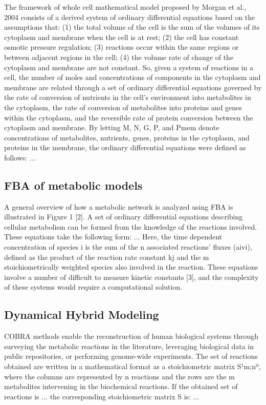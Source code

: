 The framework of whole cell mathematical model proposed by Morgan et al., 2004 consists of a derived system of ordinary differential equations based on the assumptions that: (1) the total volume of the cell is the sum of the volumes of its cytoplasm and membrane when the cell is at rest; (2) the cell has constant osmotic pressure regulation; (3) reactions occur within the same regions or between adjacent regions in the cell; (4) the volume rate of change of the cytoplasm and membrane are not constant. So, given a system of reactions in a cell, the number of moles and concentrations of components in the cytoplasm and membrane are related through a set of ordinary differential equations governed by the rate of conversion of nutrients in the cell’s environment into metabolites in the cytoplasm, the rate of conversion of metabolites into proteins and genes within the cytoplasm, and the reversible rate of protein conversion between the cytoplasm and membrane. By letting M, N, G, P, and Pmem denote concentrations of metabolites, nutrients, genes, proteins in the cytoplasm, and proteins in the membrane, the ordinary differential equations were defined as follows: ...

\subsection{FBA of metabolic models}
A general overview of how a metabolic network is analyzed using FBA is illustrated in
Figure 1 [2]. A set of ordinary differential equations describing cellular metabolism can be
formed from the knowledge of the reactions involved. These equations take the following form: ... Here, the time dependent concentration of species i is the sum of the n associated reactions’
fluxes (aivi), defined as the product of the reaction rate constant kj and the m stoichiometrically
weighted species also involved in the reaction. These equations involve a number of difficult to
measure kinetic constants [3], and the complexity of these systems would require a
computational solution.

\subsection{Dynamical Hybrid Modeling}
COBRA methods enable the reconstruction of human biological systems through surveying
the metabolic reactions in the literature, leveraging biological data in public repositories,
or performing genome-wide experiments. The set of reactions obtained are written in a
mathematical format as a stoichiometric matrix S¹m;nº, where the columns are represented by
n reactions and the rows are the m metabolites intervening in the biochemical reactions. If
the obtained set of reactions is ... the corresponding stoichiometric matrix S is: ...

